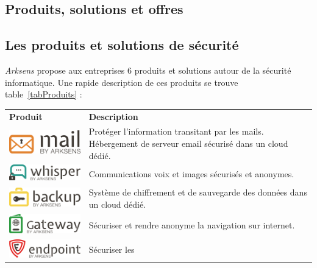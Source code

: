\documentclass[a4paper,10pt, twoside]{report}
\begin{document}
\begin{spacing}{1.2}
\section{Produits, solutions et offres}
\subsection{Les produits et solutions de s\'ecurit\'e}
\textit{Arksens} propose aux entreprises 6 produits et solutions autour de la
s\'ecurit\'e informatique. Une rapide description de ces produits se trouve
table~\ref{tabProduits} :
\begin{table}[h!]
  \centering
  \def\arraystretch{1.5}
  \setlength{\fboxsep}{13pt} %
  \setlength{\fboxrule}{0pt} %
  \begin{tabular}{m{6cm}m{6cm}}
   \rowcolor{arkred} 
    \arrayrulecolor{gray73}\hline
    \color{white} \textbf{Produit} & \color{white} \textbf{Description} \\
    \includegraphics[width=5cm, fbox]{produits/mail.png} & Prot\'eger l'information
    transitant par les mails. H\'ebergement de serveur email s\'ecuris\'e dans
    un cloud d\'edi\'e.\\
    \hline
    \includegraphics[width=5cm, fbox]{produits/whisper.png} & Communications voix
    et images s\'ecuris\'es et anonymes.\\
    \hline
    \includegraphics[width=5cm, fbox]{produits/backup.png} & Syst\`eme de
    chiffrement et de sauvegarde des donn\'ees dans un cloud d\'edi\'e.\\
    \hline
    \includegraphics[width=5cm, fbox]{produits/gateway.png} & S\'ecuriser et
    rendre anonyme la navigation sur internet.\\
    \hline
    \includegraphics[width=5cm, fbox]{produits/endpoint.png} & S\'ecuriser les

\end{tabular}
\end{table}
\end{spacing}
\end{document}
